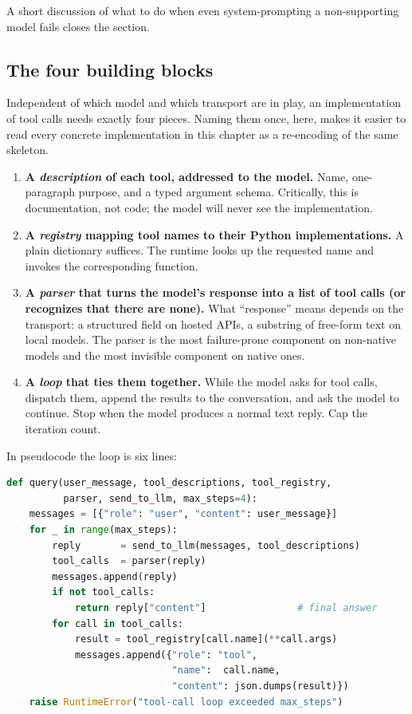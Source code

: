 A short discussion of what to do when even system-prompting a
non-supporting model fails closes the section.

\subsection{The four building blocks}
\label{sec:impl-blocks}

Independent of which model and which transport are in play, an
implementation of tool calls needs exactly four pieces. Naming them
once, here, makes it easier to read every concrete implementation in
this chapter as a re-encoding of the same skeleton.

\begin{enumerate}[label=\textbf{(\arabic*)},leftmargin=2.2em,itemsep=0.4em]
\item \textbf{A \emph{description} of each tool, addressed to the
  model.} Name, one-paragraph purpose, and a typed argument schema.
  Critically, this is documentation, not code; the model will never
  see the implementation.
\item \textbf{A \emph{registry} mapping tool names to their Python
  implementations.} A plain dictionary suffices. The runtime looks up
  the requested name and invokes the corresponding function.
\item \textbf{A \emph{parser} that turns the model's response into a
  list of tool calls (or recognizes that there are none).} What
  ``response'' means depends on the transport: a structured field on
  hosted APIs, a substring of free-form text on local models. The
  parser is the most failure-prone component on non-native models
  and the most invisible component on native ones.
\item \textbf{A \emph{loop} that ties them together.} While the model
  asks for tool calls, dispatch them, append the results to the
  conversation, and ask the model to continue. Stop when the model
  produces a normal text reply. Cap the iteration count.
\end{enumerate}

In pseudocode the loop is six lines:

\begin{lstlisting}[language=Python,caption={LLM-agnostic skeleton of a tool-calling client.},label=lst:skeleton]
def query(user_message, tool_descriptions, tool_registry,
          parser, send_to_llm, max_steps=4):
    messages = [{"role": "user", "content": user_message}]
    for _ in range(max_steps):
        reply       = send_to_llm(messages, tool_descriptions)
        tool_calls  = parser(reply)
        messages.append(reply)
        if not tool_calls:
            return reply["content"]                # final answer
        for call in tool_calls:
            result = tool_registry[call.name](**call.args)
            messages.append({"role": "tool",
                             "name":  call.name,
                             "content": json.dumps(result)})
    raise RuntimeError("tool-call loop exceeded max_steps")
\end{lstlisting}

